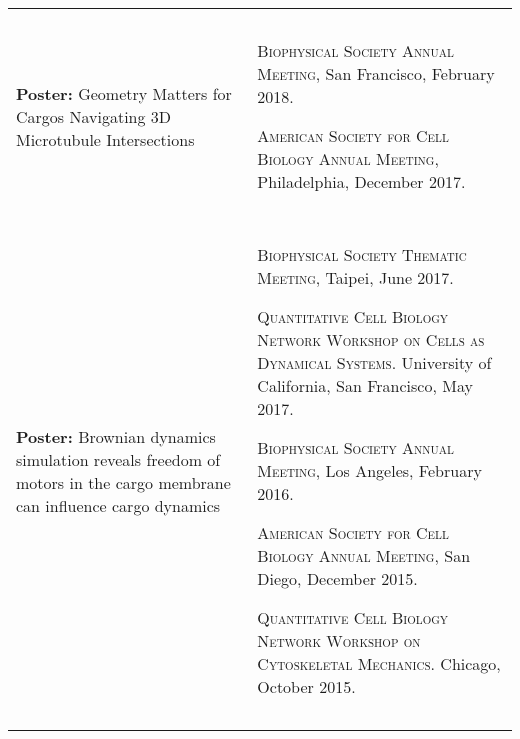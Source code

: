 \documentclass[letterpaper,10pt]{article} %
\makeatletter
\newcommand\cellwidth{\TX@col@width}
\makeatother
\begin{document}
\begin{tabularx}{\textwidth}{p{} | X}
\multicolumn{2}{c}{} \\
\multicolumn{2}{c}{} \\

\begin{minipage}{.4\textwidth}
\textbf{Poster:} Geometry Matters for Cargos Navigating 3D Microtubule Intersections
\end{minipage}
&
\begin{minipage}{\cellwidth}
\begin{description}[itemsep=.25ex,labelsep=0em]
\item \textsc{Biophysical Society Annual Meeting}, San Francisco, February 2018.
\item \textsc{American Society for Cell Biology Annual Meeting}, Philadelphia, December 2017.
\end{description}
\end{minipage} \\

\multicolumn{2}{c}{} \\
\multicolumn{2}{c}{} \\

\begin{minipage}{.4\textwidth}
\textbf{Poster:} Brownian dynamics simulation reveals freedom of motors in the cargo membrane can influence cargo dynamics
\end{minipage}
&
\begin{minipage}{\cellwidth}
\begin{description}[itemsep=.25ex,labelsep=0em]
\item \textsc{Biophysical Society Thematic Meeting}, Taipei, June 2017.
\item \textsc{Quantitative Cell Biology Network Workshop on Cells as Dynamical Systems.} University of California, San Francisco, May 2017.
\item \textsc{Biophysical Society Annual Meeting}, Los Angeles, February 2016.
\item \textsc{American Society for Cell Biology Annual Meeting}, San Diego, December 2015.
\item \textsc{Quantitative Cell Biology Network Workshop on Cytoskeletal Mechanics.} Chicago, October 2015.
\end{description}
\end{minipage} \\

\multicolumn{2}{c}{} \\
\multicolumn{2}{c}{} \\


\end{tabularx}
\end{document}
